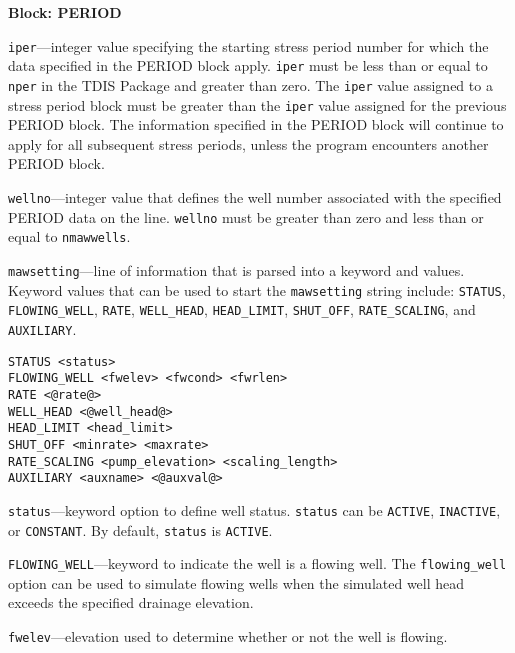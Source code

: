 \item \textbf{Block: PERIOD}

\begin{description}
\item \texttt{iper}---integer value specifying the starting stress period number for which the data specified in the PERIOD block apply.  \texttt{iper} must be less than or equal to \texttt{nper} in the TDIS Package and greater than zero.  The \texttt{iper} value assigned to a stress period block must be greater than the \texttt{iper} value assigned for the previous PERIOD block.  The information specified in the PERIOD block will continue to apply for all subsequent stress periods, unless the program encounters another PERIOD block.

\item \texttt{wellno}---integer value that defines the well number associated with the specified PERIOD data on the line. \texttt{wellno} must be greater than zero and less than or equal to \texttt{nmawwells}.

\item \texttt{mawsetting}---line of information that is parsed into a keyword and values.  Keyword values that can be used to start the \texttt{mawsetting} string include: \texttt{STATUS}, \texttt{FLOWING\_WELL}, \texttt{RATE}, \texttt{WELL\_HEAD}, \texttt{HEAD\_LIMIT}, \texttt{SHUT\_OFF}, \texttt{RATE\_SCALING}, and \texttt{AUXILIARY}.

\begin{lstlisting}[style=blockdefinition]
STATUS <status>
FLOWING_WELL <fwelev> <fwcond> <fwrlen> 
RATE <@rate@>
WELL_HEAD <@well_head@>
HEAD_LIMIT <head_limit>
SHUT_OFF <minrate> <maxrate> 
RATE_SCALING <pump_elevation> <scaling_length> 
AUXILIARY <auxname> <@auxval@> 
\end{lstlisting}

\item \texttt{status}---keyword option to define well status.  \texttt{status} can be \texttt{ACTIVE}, \texttt{INACTIVE}, or \texttt{CONSTANT}. By default, \texttt{status} is \texttt{ACTIVE}.

\item \texttt{FLOWING\_WELL}---keyword to indicate the well is a flowing well.  The \texttt{flowing\_well} option can be used to simulate flowing wells when the simulated well head exceeds the specified drainage elevation.

\item \texttt{fwelev}---elevation used to determine whether or not the well is flowing.


\end{description}
